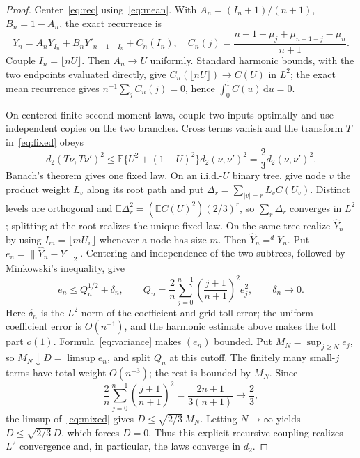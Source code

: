 \documentclass[10pt]{article}
\newcommand{\E}{\mathbb E}
\newcommand{\dd}{\mathrm d}
\begin{document}
\begin{proof}
Center~\eqref{eq:rec} using~\eqref{eq:mean}.  With
$A_n=(I_n+1)/(n+1)$, $B_n=1-A_n$, the exact recurrence is
\[
Y_n=A_nY_{I_n}+B_nY'_{n-1-I_n}+C_n(I_n),\quad
C_n(j)=\frac{n-1+\mu_j+\mu_{n-1-j}-\mu_n}{n+1}.
\]
Couple $I_n=\lfloor nU\rfloor$.  Then $A_n\to U$ uniformly.  Standard
harmonic bounds, with the two endpoints evaluated directly, give
$C_n(\lfloor nU\rfloor)\to C(U)$ in $L^2$; the exact mean recurrence gives
$n^{-1}\sum_jC_n(j)=0$, hence $\int_0^1C(u)\,\dd u=0$.

On centered finite-second-moment laws, couple two inputs optimally and use
independent copies on the two branches.  Cross terms vanish and the transform
$T$ in~\eqref{eq:fixed} obeys
\begin{equation}\label{eq:contract}
 d_2(T\nu,T\nu')^2\le
 \E\{U^2+(1-U)^2\}d_2(\nu,\nu')^2
 =\frac23d_2(\nu,\nu')^2.
\end{equation}
Banach's theorem gives one fixed law.  On an i.i.d.-$U$ binary tree, give node
$v$ the product weight $L_v$ along its root path and put
$\Delta_r=\sum_{|v|=r}L_vC(U_v)$.  Distinct levels are orthogonal and
$\E\Delta_r^2=(\E C(U)^2)(2/3)^r$, so $\sum_r\Delta_r$ converges in $L^2$;
splitting at the root realizes the unique fixed law.  On the same tree
realize $\widehat Y_n$ by using
$I_m=\lfloor mU_v\rfloor$ whenever a node has size $m$.  Then
$\widehat Y_n\mathrel=^dY_n$.  Put $e_n=\|\widehat Y_n-Y\|_2$.  Centering and
independence of the two subtrees, followed by Minkowski's inequality, give
\begin{equation}\label{eq:mixed}
e_n\le Q_n^{1/2}+\delta_n,\qquad
Q_n=\frac2n\sum_{j=0}^{n-1}\left(\frac{j+1}{n+1}\right)^2e_j^2,
\qquad\delta_n\to0.
\end{equation}
Here $\delta_n$ is the $L^2$ norm of the coefficient and grid-toll error; the
uniform coefficient error is $O(n^{-1})$, and the harmonic estimate above
makes the toll part $o(1)$.  Formula~\eqref{eq:variance} makes $(e_n)$ bounded.
Put $M_N=\sup_{j\ge N}e_j$, so $M_N\downarrow D=\limsup e_n$, and split
$Q_n$ at this cutoff.  The finitely many small-$j$ terms have total weight
$O(n^{-3})$; the rest is bounded by $M_N$.  Since
\[
 \frac2n\sum_{j=0}^{n-1}\left(\frac{j+1}{n+1}\right)^2
 =\frac{2n+1}{3(n+1)}\longrightarrow\frac23,
\]
the limsup of~\eqref{eq:mixed} gives $D\le\sqrt{2/3}\,M_N$.  Letting
$N\to\infty$ yields $D\le\sqrt{2/3}\,D$, which forces $D=0$.
Thus this explicit recursive coupling realizes $L^2$ convergence and, in
particular, the laws converge in $d_2$.
\end{proof}
\fi
\end{document}
